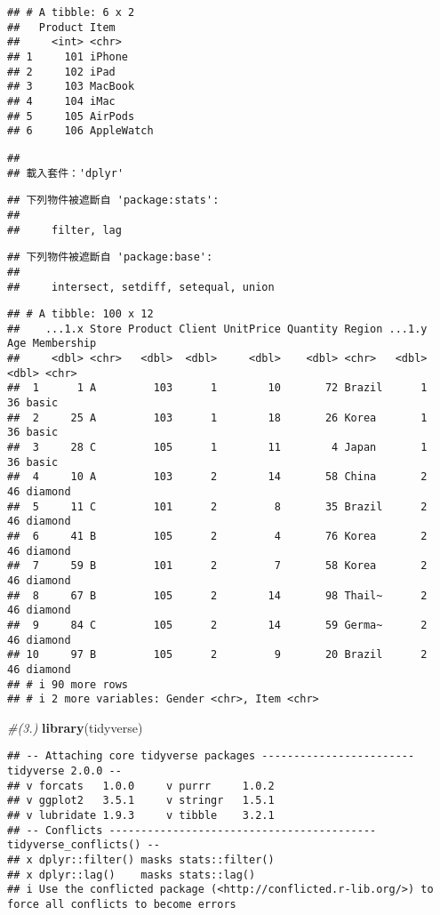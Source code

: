 \documentclass[
]{article}
\newenvironment{Shaded}{\begin{snugshade}}{\end{snugshade}}
\newcommand{\CommentTok}[1]{\textcolor[rgb]{0.56,0.35,0.01}{\textit{#1}}}
\newcommand{\FunctionTok}[1]{\textcolor[rgb]{0.13,0.29,0.53}{\textbf{#1}}}
\newcommand{\NormalTok}[1]{#1}
\begin{document}
\begin{verbatim}
## # A tibble: 6 x 2
##   Product Item      
##     <int> <chr>     
## 1     101 iPhone    
## 2     102 iPad      
## 3     103 MacBook   
## 4     104 iMac      
## 5     105 AirPods   
## 6     106 AppleWatch
\end{verbatim}

\begin{verbatim}
## 
## 載入套件：'dplyr'
\end{verbatim}

\begin{verbatim}
## 下列物件被遮斷自 'package:stats':
## 
##     filter, lag
\end{verbatim}

\begin{verbatim}
## 下列物件被遮斷自 'package:base':
## 
##     intersect, setdiff, setequal, union
\end{verbatim}

\begin{verbatim}
## # A tibble: 100 x 12
##    ...1.x Store Product Client UnitPrice Quantity Region ...1.y   Age Membership
##     <dbl> <chr>   <dbl>  <dbl>     <dbl>    <dbl> <chr>   <dbl> <dbl> <chr>     
##  1      1 A         103      1        10       72 Brazil      1    36 basic     
##  2     25 A         103      1        18       26 Korea       1    36 basic     
##  3     28 C         105      1        11        4 Japan       1    36 basic     
##  4     10 A         103      2        14       58 China       2    46 diamond   
##  5     11 C         101      2         8       35 Brazil      2    46 diamond   
##  6     41 B         105      2         4       76 Korea       2    46 diamond   
##  7     59 B         101      2         7       58 Korea       2    46 diamond   
##  8     67 B         105      2        14       98 Thail~      2    46 diamond   
##  9     84 C         105      2        14       59 Germa~      2    46 diamond   
## 10     97 B         105      2         9       20 Brazil      2    46 diamond   
## # i 90 more rows
## # i 2 more variables: Gender <chr>, Item <chr>
\end{verbatim}

\begin{Shaded}
\begin{Highlighting}[]
\CommentTok{\#(3.)}
\FunctionTok{library}\NormalTok{(tidyverse)}
\end{Highlighting}
\end{Shaded}

\begin{verbatim}
## -- Attaching core tidyverse packages ------------------------ tidyverse 2.0.0 --
## v forcats   1.0.0     v purrr     1.0.2
## v ggplot2   3.5.1     v stringr   1.5.1
## v lubridate 1.9.3     v tibble    3.2.1
## -- Conflicts ------------------------------------------ tidyverse_conflicts() --
## x dplyr::filter() masks stats::filter()
## x dplyr::lag()    masks stats::lag()
## i Use the conflicted package (<http://conflicted.r-lib.org/>) to force all conflicts to become errors
\end{verbatim}
\end{document}
